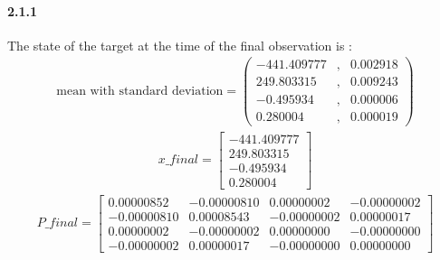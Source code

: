 \documentclass[a4paper]{article}
\begin{document}
\paragraph{2.1.1 } The state of the target at the time of the final observation is : \\
\begin{align*}
\text{mean with standard deviation} = 
	\left(\begin{matrix}
		-441.409777 & ,   &    0.002918 \\
    	249.803315 & ,   &    0.009243 \\
     	-0.495934 & ,   &    0.000006 \\
      	0.280004 & ,   &    0.000019
	\end{matrix}\right)
\end{align*}
\begin{align*}
x\_final = \begin{bmatrix}
		-441.409777 \\
    	249.803315 \\
     	-0.495934 \\
      	0.280004 
	\end{bmatrix}
\end{align*}
\begin{align*}
P\_final = \begin{bmatrix}
		0.00000852  &  -0.00000810  &   0.00000002  &  -0.00000002 \\
   -0.00000810  &   0.00008543  &  -0.00000002  &   0.00000017 \\
    0.00000002  &  -0.00000002  &   0.00000000  &  -0.00000000 \\
   -0.00000002  &   0.00000017  &  -0.00000000  &   0.00000000 
	\end{bmatrix}
\end{align*} \\
\end{document}
